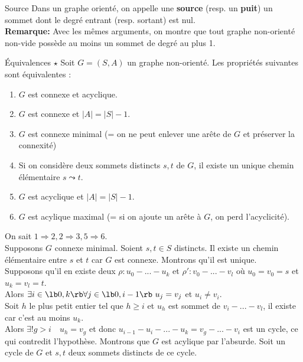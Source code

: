 \documentclass[french, 11pt]{article}
\begin{document}
\vspace*{-0.7cm}

\begin{defi}{Source}{}
    Dans un graphe orienté, on appelle une \textbf{source} (resp. un \textbf{puit}) un sommet dont le degré entrant (resp. sortant) est nul.\\
    \textbf{Remarque:} Avec les mêmes arguments, on montre que tout graphe non-orienté non-vide possède au moins un sommet de degré au plus 1.
\end{defi}

\vspace*{-0.7cm}

\begin{prop}{Équivalences $\star$}{}
    Soit $G=(S,A)$ un graphe non-orienté. Les propriétés suivantes sont équivalentes :
    \begin{enumerate}
        \item $G$ est connexe et acyclique.
        \item $G$ est connexe et $|A|=|S|-1$.
        \item $G$ est connexe minimal (= on ne peut enlever une arête de $G$ et préserver la connexité)
        \item Si on considère deux sommets distincts $s,t$ de $G$, il existe un unique chemin élémentaire $s\leadsto t$.
        \item $G$ est acyclique et $|A|=|S|-1$.
        \item $G$ est acylique maximal (= si on ajoute un arête à $G$, on perd l'acyclicité).
    \end{enumerate}
    \tcblower
    On sait $1\Rightarrow2,2\Rightarrow3,5\Rightarrow6$.\\
     Supposons $G$ connexe minimal. Soient $s,t\in S$ distincts. Il existe un chemin élémentaire entre $s$ et $t$ car $G$ est connexe. Montrons qu'il est unique.\\
    Supposons qu'il en existe deux $\rho:u_0-...-u_k$ et $\rho':v_0-...-v_l$ où $u_0=v_0=s$ et $u_k=v_l=t$.\\
    Alors $\exists i \in \lb0,k\rb \forall j \in \lb 0, i-1 \rb ~ u_j = v_j$ et $u_i\neq v_i$.\\
    Soit $h$ le plus petit entier tel que $h\geq i$ et $u_h$ est sommet de $v_i-...-v_l$, il existe car c'est au moins $u_k$.\\
    Alors $\exists!g>i \quad u_h=v_g$  et donc $u_{i-1}-u_i-...-u_k=v_g-...-v_i$ est un cycle, ce qui contredit l'hypothèse.\n
     Montrons que $G$ est acylique par l'absurde. Soit un cycle de $G$ et $s,t$ deux sommets distincts de ce cycle.

\end{prop}
\end{document}
